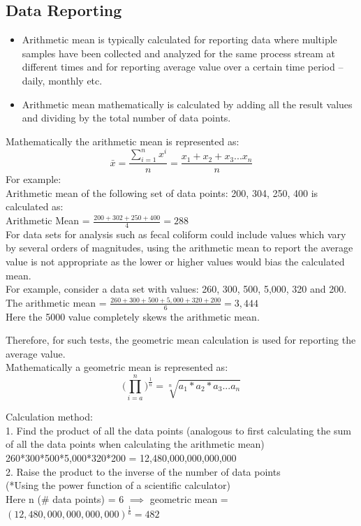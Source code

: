 \subsection{Data Reporting}	
		\begin{itemize}
			\item Arithmetic mean is typically calculated for reporting data where multiple samples have been collected and analyzed for the same process stream at different times and for reporting average value over a certain time period – daily, monthly etc.\\ \item Arithmetic mean mathematically is calculated by adding all the result values and dividing by the total number of data points.\\
		\end{itemize}
		Mathematically the arithmetic mean is represented as:\\
		$$\bar{x}=\frac{\sum_{i=1}^{n} x^i}{n} = \frac{x_1+x_2+x_3...x_n}{n}$$
		For example:\\
		Arithmetic mean of the following set of data points:  200, 304, 250, 400 is calculated as:\\
		\vspace{10pt}
		Arithmetic Mean = $\frac{200 + 302 + 250 + 400}{4}= 288$\\
		\vspace{10pt}
		For data sets for analysis such as fecal coliform could include values which vary by several orders of magnitudes, using the arithmetic mean to report the average value is not appropriate as the lower or higher values would bias the calculated mean.\\
		\vspace{10pt}
		For example, consider a data set with values:  260, 300, 500, 5,000, 320 and 200.\\
		\vspace{10pt}
		The arithmetic mean = $\frac{260+300+500+5,000+320+200}{6} = 3,444$\\
		Here the 5000 value completely skews the arithmetic mean.
		
		Therefore, for such tests, the geometric mean calculation is used for reporting the average value.\\
		
		
		Mathematically a geometric mean is represented as:\\
		$$\Bigg(\prod_{i=a}^n\Bigg)^{\frac{1}{n}}=\sqrt[n]{a_1*a_2*a_3...a_n}$$
		 
		Calculation method:\\
		1.	Find the product of all the data points (analogous to first calculating the sum of all the data points when calculating the arithmetic mean)\\
		260*300*500*5,000*320*200 = 12,480,000,000,000,000\\
		2.	Raise the product to the inverse of the number of data points\\
		(*Using the power function of a scientific calculator)\\
		Here n (\# data points) = 6 $\implies$ geometric mean = $(12,480,000,000,000,000)^{\frac{1}{6}}   = 482$

